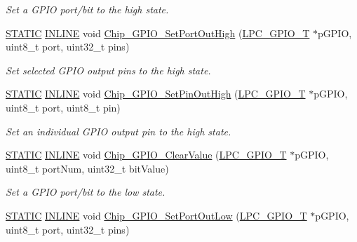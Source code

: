 \begin{DoxyCompactItemize}
\begin{DoxyCompactList}\small\item\em Set a G\+P\+IO port/bit to the high state. \end{DoxyCompactList}\item 
\hyperlink{group___l_p_c___types___public___macros_ga10b2d890d871e1489bb02b7e70d9bdfb}{S\+T\+A\+T\+IC} \hyperlink{spifi__18xx__43xx_8h_a2eb6f9e0395b47b8d5e3eeae4fe0c116}{I\+N\+L\+I\+NE} void \hyperlink{group___g_p_i_o__18_x_x__43_x_x_ga8a9b2dd9c70e835b718c2edc5b9701af}{Chip\+\_\+\+G\+P\+I\+O\+\_\+\+Set\+Port\+Out\+High} (\hyperlink{struct_l_p_c___g_p_i_o___t}{L\+P\+C\+\_\+\+G\+P\+I\+O\+\_\+T} $\ast$p\+G\+P\+IO, uint8\+\_\+t port, uint32\+\_\+t pins)
\begin{DoxyCompactList}\small\item\em Set selected G\+P\+IO output pins to the high state. \end{DoxyCompactList}\item 
\hyperlink{group___l_p_c___types___public___macros_ga10b2d890d871e1489bb02b7e70d9bdfb}{S\+T\+A\+T\+IC} \hyperlink{spifi__18xx__43xx_8h_a2eb6f9e0395b47b8d5e3eeae4fe0c116}{I\+N\+L\+I\+NE} void \hyperlink{group___g_p_i_o__18_x_x__43_x_x_ga1447549f6e88a29b5589326f177d4a96}{Chip\+\_\+\+G\+P\+I\+O\+\_\+\+Set\+Pin\+Out\+High} (\hyperlink{struct_l_p_c___g_p_i_o___t}{L\+P\+C\+\_\+\+G\+P\+I\+O\+\_\+T} $\ast$p\+G\+P\+IO, uint8\+\_\+t port, uint8\+\_\+t pin)
\begin{DoxyCompactList}\small\item\em Set an individual G\+P\+IO output pin to the high state. \end{DoxyCompactList}\item 
\hyperlink{group___l_p_c___types___public___macros_ga10b2d890d871e1489bb02b7e70d9bdfb}{S\+T\+A\+T\+IC} \hyperlink{spifi__18xx__43xx_8h_a2eb6f9e0395b47b8d5e3eeae4fe0c116}{I\+N\+L\+I\+NE} void \hyperlink{group___g_p_i_o__18_x_x__43_x_x_ga94367ee41db6fa49cfba6605324e8d07}{Chip\+\_\+\+G\+P\+I\+O\+\_\+\+Clear\+Value} (\hyperlink{struct_l_p_c___g_p_i_o___t}{L\+P\+C\+\_\+\+G\+P\+I\+O\+\_\+T} $\ast$p\+G\+P\+IO, uint8\+\_\+t port\+Num, uint32\+\_\+t bit\+Value)
\begin{DoxyCompactList}\small\item\em Set a G\+P\+IO port/bit to the low state. \end{DoxyCompactList}\item 
\hyperlink{group___l_p_c___types___public___macros_ga10b2d890d871e1489bb02b7e70d9bdfb}{S\+T\+A\+T\+IC} \hyperlink{spifi__18xx__43xx_8h_a2eb6f9e0395b47b8d5e3eeae4fe0c116}{I\+N\+L\+I\+NE} void \hyperlink{group___g_p_i_o__18_x_x__43_x_x_ga2f85c3b0c7a48d68a508a0f94f6e691e}{Chip\+\_\+\+G\+P\+I\+O\+\_\+\+Set\+Port\+Out\+Low} (\hyperlink{struct_l_p_c___g_p_i_o___t}{L\+P\+C\+\_\+\+G\+P\+I\+O\+\_\+T} $\ast$p\+G\+P\+IO, uint8\+\_\+t port, uint32\+\_\+t pins)

\end{DoxyCompactItemize}
